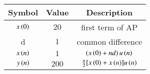 \begin{tabular}{|c|c|c|}
   \hline
   \textbf{Symbol} & \textbf{Value}& \textbf{Description} \\
   \hline
        $ x\left(0\right)$ & $20$ & first term of AP\\
        \hline
        d & $1$ & common difference\\
        \hline
        $x\left(n\right)$ & $1$  & $\left(x\left(0\right)+nd\right)u\left(n\right)$\\
        \hline
        $y\left(n\right)$ & $200$ & $\frac{n}{2}[x\left(0\right)+x\left(n\right)]u\left(n\right)$\\
        \hline
\end{tabular}
